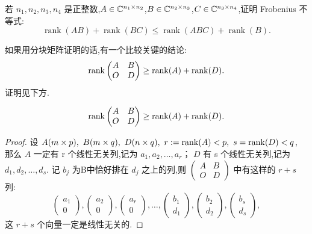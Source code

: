 \begin{problem}
若 $n_1,n_2,n_3,n_4$ 是正整数,$A\in\mathbb{C}^{n_1\times n_2}$,$B\in\mathbb{C}^{n_2\times n_3}$,$C\in\mathbb{C}^{n_3\times n_4}$,证明 Frobenius 不等式:
\[
    \operatorname{rank}(AB)+\operatorname{rank}(BC)\le \operatorname{rank}(ABC)+\operatorname{rank}(B).
\]

    \begin{solnote}
        如果用分块矩阵证明的话,有一个比较关键的结论:
        \[
            \operatorname{rank} \begin{pmatrix}
                A & B \\ O & D
            \end{pmatrix}
            \ge \operatorname{rank}(A) + \operatorname{rank}(D).
        \]
        证明见下方.
    \end{solnote}

    \begin{solution}
        \begin{sollemma*}
            \[
            \operatorname{rank} \begin{pmatrix}
                A & B \\ O & D
            \end{pmatrix}
            \ge \operatorname{rank}(A) + \operatorname{rank}(D).
            \]
        \end{sollemma*}

        \begin{proof}[Proof]
            设 $A(m \times p), \ B(m \times q), \ D(n \times q), \ r := \operatorname{rank}(A) < p, \ s = \operatorname{rank}(D) < q$,
            那么 $A$ 一定有 r 个线性无关列,记为 $a_1,a_2, \ldots, a_r$； $D$ 有 s 个线性无关列,记为 $d_1,d_2, \ldots, d_s$.
            记 $b_j$ 为B中恰好排在 $d_j$ 之上的列,则 $\begin{pmatrix}
                A & B \\ O & D
            \end{pmatrix}$ 中有这样的 $r + s$ 列:
            \[
                \begin{pmatrix} a_1 \\ 0 \end{pmatrix},
                \begin{pmatrix} a_2 \\ 0 \end{pmatrix},
                \begin{pmatrix} a_r \\ 0 \end{pmatrix},
                \ldots,
                \begin{pmatrix} b_1 \\ d_1 \end{pmatrix},
                \begin{pmatrix} b_2 \\ d_2 \end{pmatrix},
                \begin{pmatrix} b_s \\ d_s \end{pmatrix},
            \]
            这 $r + s$ 个向量一定是线性无关的.


\end{proof}
\end{solution}
\end{problem}
